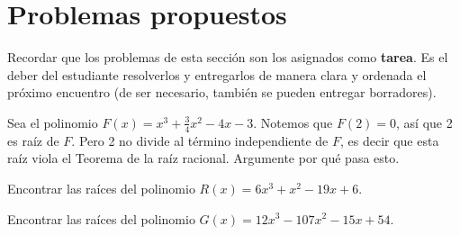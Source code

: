 \section{Problemas propuestos}

Recordar que los problemas de esta sección son los asignados como \textbf{tarea}.
Es el deber del estudiante resolverlos y entregarlos de manera clara y ordenada el próximo encuentro
(de ser necesario, también se pueden entregar borradores).

\begin{section-problem}
    Sea el polinomio $F(x) = x^3 + \frac{3}{4}x^2 - 4x - 3$.
    Notemos que $F(2) = 0$, así que 2 es raíz de $F$.
    Pero 2 no divide al término independiente de $F$, es decir que esta raíz viola el Teorema de la raíz racional.
    Argumente por qué pasa esto.
\end{section-problem}

\begin{section-problem}
    Encontrar las raíces del polinomio $R(x) = 6x^3 + x^2 - 19x + 6$.
\end{section-problem}

\begin{section-problem}
    Encontrar las raíces del polinomio $G(x) = 12x^3 - 107x^2 - 15x + 54$.
\end{section-problem}